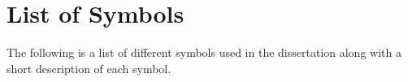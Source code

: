 \chapter*{List of Symbols} 
The following is a list of different symbols used in the dissertation along with a short description of each symbol. 
\newcommand\listSymbol[3]{\protected\gdef#1{#2}#2 & #3 \tabularnewline \addlinespace[2pt]} %
\newcommand\nolistSymbol[3]{\protected\gdef#1{#2}} %
%
\nolistSymbol{\obsVar}{\ensuremath{\mathbf{y}}}{Feature vector at frame $k$}
\nolistSymbol{\hidVar}{\ensuremath{\mathbf{x}}}{A vector of latent variables at frame $k$}
\nolistSymbol{\qInd}{\ensuremath{q}}{Query pattern indexing}
